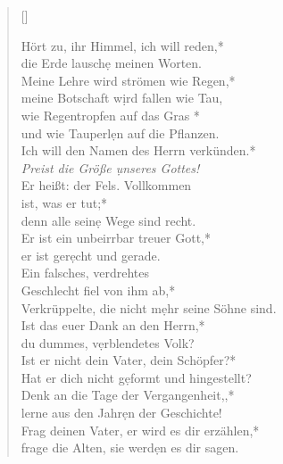 \vspace{0.3cm}


\begin{verse}[\versewidth]
 
Hört zu, ihr Himmel, ich will reden,*\\
die Erde lausch\d e meinen Worten.\\
\vin Meine Lehre wird strömen wie Regen,*\\
\vin meine Botschaft w\d ird fallen wie Tau,\\
wie Regentropfen auf das Gras *\\
und wie Tauperl\d en auf die Pflanzen.\\
\vin Ich will den Namen des Herrn verkünden.*\\
\vin \textit{Preist die Größe \d unseres Gottes!}\\
Er heißt: der Fels. Vollkommen \\ ist, was er tut;*\\
denn alle sein\d e Wege sind recht.\\
\vin Er ist ein unbeirrbar treuer Gott,*\\
\vin er ist ger\d echt und gerade.\\
Ein falsches, verdrehtes \\  Geschlecht fiel von ihm ab,*\\
Verkrüppelte, die nicht m\d ehr seine Söhne sind.\\
\vin Ist das euer Dank an den Herrn,*\\
\vin du dummes, v\d erblendetes Volk?\\
Ist er nicht dein Vater, dein Schöpfer?*\\
Hat er dich nicht g\d eformt und hingestellt? \\

Denk an die Tage der Vergangenheit,,*\\
lerne aus den Jahr\d en der Geschichte!\\
\vin Frag deinen Vater, er wird es dir erzählen,*\\
\vin frage die Alten, sie werd\d en es dir sagen. \\

\vspace{0.3cm}

\vspace{0.3cm}


\end{verse}
